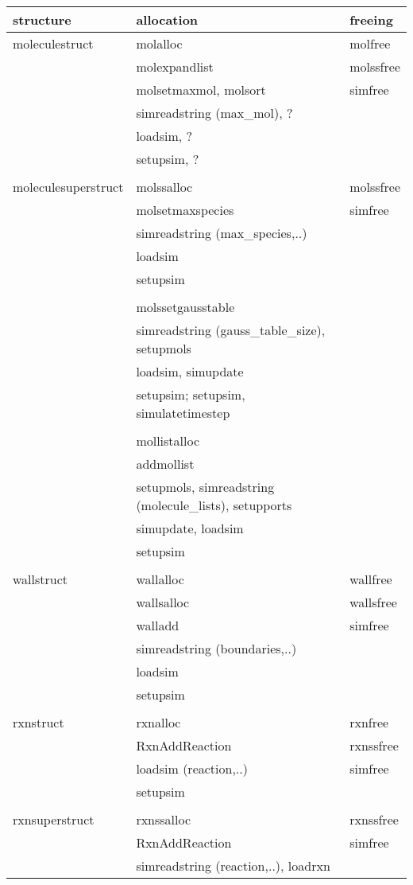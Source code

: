 \documentclass {book}
\begin{document}
\begin{ttfamily}
\begin{longtable}[c]{lll}
structure&allocation&freeing\\
\hline
moleculestruct&molalloc&molfree\\
&molexpandlist&molssfree\\
&molsetmaxmol, molsort&simfree\\
&simreadstring (max\_mol), ?\\
&loadsim, ?\\
&setupsim, ?\\
\\
moleculesuperstruct&molssalloc&molssfree\\
&molsetmaxspecies&simfree\\
&simreadstring (max\_species,..)\\
&loadsim\\
&setupsim\\
\\
&molssetgausstable\\
&simreadstring (gauss\_table\_size), setupmols\\
&loadsim, simupdate\\
&setupsim; setupsim, simulatetimestep\\
\\
&mollistalloc\\
&addmollist\\
&setupmols, simreadstring (molecule\_lists), setupports\\
&simupdate, loadsim\\
&setupsim\\
\\
wallstruct&wallalloc&wallfree\\
&wallsalloc&wallsfree\\
&walladd&simfree\\
&simreadstring (boundaries,..)\\
&loadsim\\
&setupsim\\
\\
rxnstruct&rxnalloc&rxnfree\\
&RxnAddReaction&rxnssfree\\
&loadsim (reaction,..)&simfree\\
&setupsim\\
\\
rxnsuperstruct&rxnssalloc&rxnssfree\\
&RxnAddReaction&simfree\\
&simreadstring (reaction,..), loadrxn\\

\end{longtable}
\end{ttfamily}
\end{document}
